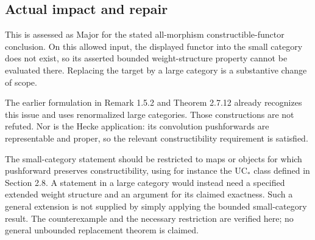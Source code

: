 \documentclass[10pt]{article}
\begin{document}
\subsection*{Actual impact and repair}
This is assessed as Major for the stated all-morphism constructible-functor conclusion. On this allowed input, the displayed functor into the small category does not exist, so its asserted bounded weight-structure property cannot be evaluated there. Replacing the target by a large category is a substantive change of scope.\par
The earlier formulation in Remark 1.5.2 and Theorem 2.7.12 already recognizes this issue and uses renormalized large categories. Those constructions are not refuted. Nor is the Hecke application: its convolution pushforwards are representable and proper, so the relevant constructibility requirement is satisfied.\par
The small-category statement should be restricted to maps or objects for which pushforward preserves constructibility, using for instance the \(\mathrm{UC}_*\) class defined in Section 2.8. A statement in a large category would instead need a specified extended weight structure and an argument for its claimed exactness. Such a general extension is not supplied by simply applying the bounded small-category result. The counterexample and the necessary restriction are verified here; no general unbounded replacement theorem is claimed.\par
\end{document}
